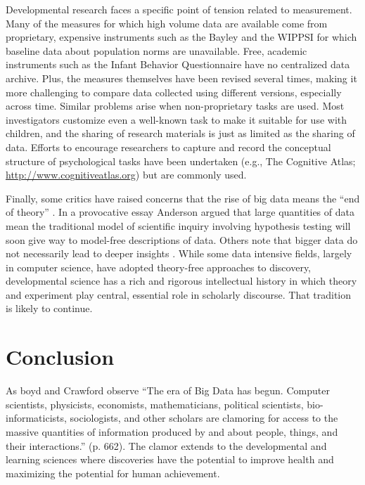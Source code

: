 \documentclass[letterpaper,man,apacite,natbib]{apa6}
\begin{document}
Developmental research faces a specific point of tension related to measurement.
Many of the measures for which high volume data are available come from proprietary, expensive instruments such as the Bayley and the WIPPSI for which baseline data about population norms are unavailable.
Free, academic instruments such as the Infant Behavior Questionnaire have no centralized data archive.
Plus, the measures themselves have been revised several times, making it more challenging to compare data collected using different versions, especially across time.
Similar problems arise when non-proprietary tasks are used.
Most investigators customize even a well-known task to make it suitable for use with children, and the sharing of research materials is just as limited as the sharing of data.
Efforts to encourage researchers to capture and record the conceptual structure of psychological tasks have been undertaken (e.g., The Cognitive Atlas; \url{http://www.cognitiveatlas.org}) but are commonly used.

Finally, some critics have raised concerns that the rise of big data means the ``end of theory'' \cite{anderson_end_2008}.
In a provocative essay Anderson \citeyear{anderson_end_2008} argued that large quantities of data mean the traditional model of scientific inquiry involving hypothesis testing will soon give way to model-free descriptions of data.
Others note that bigger data do not necessarily lead to deeper insights \cite{graham_big_2012}.
While some data intensive fields, largely in computer science, have adopted theory-free approaches to discovery, developmental science has a rich and rigorous intellectual history in which theory and experiment play central, essential role in scholarly discourse.
That tradition is likely to continue.
\section{Conclusion}
As boyd and Crawford \citeyear{boyd_critical_2012} observe ``The era of Big Data has begun. Computer scientists, physicists, economists, mathematicians, political scientists, bio-informaticists, sociologists, and other scholars are clamoring for access to the massive quantities of information produced by and about people, things, and their interactions.'' (p. 662).
The clamor extends to the developmental and learning sciences where discoveries have the potential to improve health and maximizing the potential for human achievement.
\end{document}

